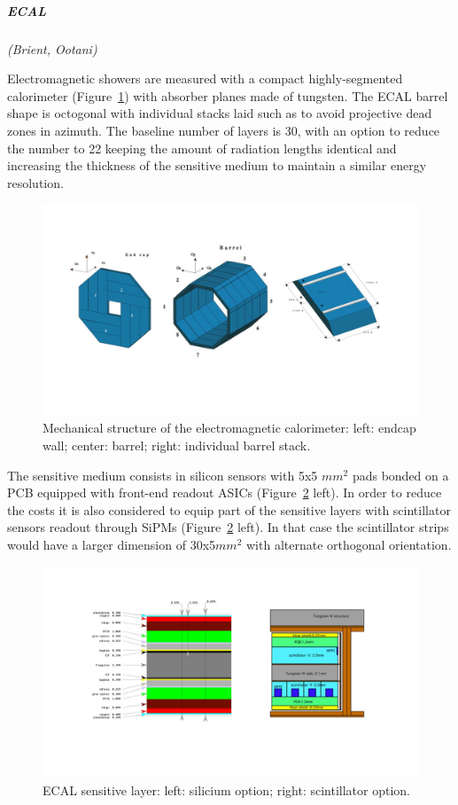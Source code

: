 \vspace{1cm}
\subparagraph*{\bf ECAL}
\textit{(Brient, Ootani)}

Electromagnetic showers are measured with a compact highly-segmented calorimeter (Figure~\ref{fig:det:ECAL}) with absorber planes made of tungsten. The ECAL barrel shape is octogonal with individual stacks laid such as to avoid projective dead zones in azimuth. The baseline number of layers is 30, with an option to reduce the number to 22 keeping the amount of radiation lengths identical and increasing the thickness of the sensitive medium to maintain a similar energy resolution.

\begin{figure}[t!]
\centering
\includegraphics[width=1.2\hsize]{Detector/fig/ECAL_structure.jpg}
\caption{Mechanical structure of the electromagnetic calorimeter: left: endcap wall; center: barrel; right: individual barrel stack.}
\label{fig:det:ECAL}
\end{figure}

The sensitive medium consists in silicon sensors with 5x5 $mm^2$ pads bonded on a PCB equipped with front-end readout ASICs (Figure~\ref{fig:det:ECAL_readout} left). In order to reduce the costs it is also considered to equip part of the sensitive layers with scintillator sensors readout through SiPMs (Figure~\ref{fig:det:ECAL_readout} left). In that case the scintillator strips would have a larger dimension of 30x5$mm^2$ with alternate orthogonal orientation.  

\begin{figure}[t!]
\centering
\includegraphics[width=1.0\hsize]{Detector/fig/ECAL_readout.jpg}
\caption{ECAL sensitive layer: left: silicium option; right: scintillator option.}
\label{fig:det:ECAL_readout}
\end{figure}


